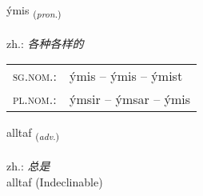 \documentclass[frontgrid, backgrid]{flacards}\usepackage[]{graphicx}\usepackage[]{xcolor}
\begin{document}
\renewcommand{\blhead}{\vskip5pt {\small\bfseries\footnotesize Fornafn | 代词 }}
\renewcommand{\bcfoot}{\vskip5pt \hspace{2pt}{\small\bfseries\footnotesize 1K}}


{ýmis \small{\textsubscript{(\textit{pron.})}} \\[1ex] %
\textphonetic{[iːmɪs]} \\
zh.: \emph{各种各样的} \\  [2ex]
\renewcommand*{\arraystretch}{0.8}
\begin{tabular}{ll}
\textsc{sg.nom.}: & ýmis  --  ýmis -- ýmist \\ 
\textsc{pl.nom.}: & ýmsir -- ýmsar -- ýmis
\end{tabular}
}


\renewcommand{\flhead}{\vskip5pt \fboxsep=0pt {\small\bfseries\footnotesize Atviksorð | 副词}}
\renewcommand{\fcfoot}{\vskip5pt \fboxsep=0pt \hspace{2pt}{\small\bfseries\footnotesize 1K}}

\renewcommand{\blhead}{\vskip5pt {\small\bfseries\footnotesize Atviksorð | 副词 }}
\renewcommand{\bcfoot}{\vskip5pt \hspace{2pt}{\small\bfseries\footnotesize 1K}}


{alltaf \small{\textsubscript{(\textit{adv.})}} \\[1ex]
\textphonetic{[al̥taf]} \\
zh.: \emph{总是} \\  [2ex]
alltaf (Indeclinable)}


\renewcommand{\flhead}{\vskip5pt \fboxsep=0pt {\small\bfseries\footnotesize Atviksorð | 副词}}
\renewcommand{\fcfoot}{\vskip5pt \fboxsep=0pt \hspace{2pt}{\small\bfseries\footnotesize 1K}}

\renewcommand{\blhead}{\vskip5pt {\small\bfseries\footnotesize Atviksorð | 副词 }}
\renewcommand{\bcfoot}{\vskip5pt \hspace{2pt}{\small\bfseries\footnotesize 1K}}
\end{document}
